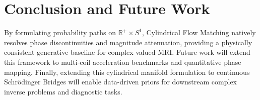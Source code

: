 \section{Conclusion and Future Work}
By formulating probability paths on $\mathbb{R}^+ \times S^1$, Cylindrical Flow Matching natively resolves phase discontinuities and magnitude attenuation, providing a physically consistent generative baseline for complex-valued MRI. Future work will extend this framework to multi-coil acceleration benchmarks and quantitative phase mapping. Finally, extending this cylindrical manifold formulation to continuous Schr{\"o}dinger Bridges will enable data-driven priors for downstream complex inverse problems and diagnostic tasks.
